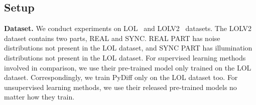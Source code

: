 \documentclass{article}
\begin{document}
\begin{table}[tb]  
    
\setlength{\tabcolsep}{3pt}
        \renewcommand{\arraystretch}{0.9} \centering
	\small
            
         \caption{Quantitative results on the LOL dataset in terms of PSNR, SSIM, and LPIPS.  () denotes that larger (smaller) values lead to better quality.}
	\label{tab:LOL}
                    
	
\end{table}


\subsection{Setup}

\noindent \textbf{Dataset.}
We conduct experiments on LOL~\cite{wei2018deep} and LOLV2~\cite{yang2021sparse} datasets. The LOLV2 dataset contains two parts, REAL and SYNC. REAL PART has noise distributions not present in the LOL dataset, and SYNC PART has illumination distributions not present in the LOL dataset. For supervised learning methods involved in comparison, we use their pre-trained model only trained on the LOL dataset. Correspondingly, we train PyDiff only on the LOL dataset too. For unsupervised learning methods, we use their released pre-trained models no matter how they train.
\end{document}
